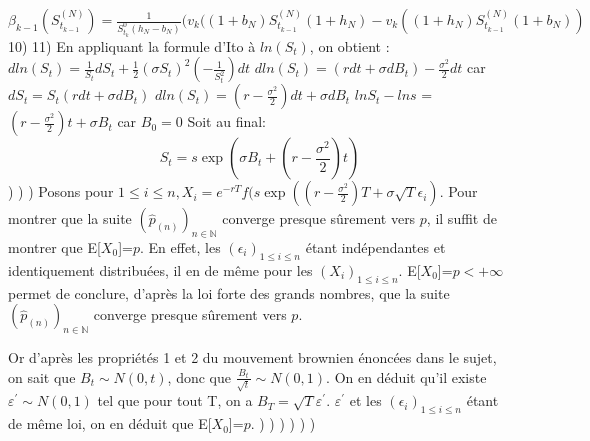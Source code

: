 \documentclass{exam}
\begin{document}
\vspace{0.5cm}
$\beta_{k-1}(S_{t_{k-1}}^{(N)})=\frac{1}{S_{t_k}^0(h_N-b_N)}(v_k((1+b_N)S_{t_{k-1}}^{(N)}(1+h_N)-v_k((1+h_N)S_{t_{k-1}}^{(N)}(1+b_N))$
\newline
\vspace{0.5cm}
10) 
\newline
\vspace{0.5cm}
11) En appliquant la formule d'Ito à $ln (S_t)$, on obtient :
\newline
\espace
$dln(S_t)=\frac{1}{S_t}dS_t + \frac{1}{2}(\sigma S_t)^{2}(-\frac{1}{S_t^{2}})dt$  
\newline
\espace
\Longleftrightarrow \hspace{0.5cm} $dln(S_t)=(r dt + \sigma dB_t)-\frac{\sigma^{2}}{2} dt$ \hspace{0.5cm} car \hspace{0.5cm} $dS_t=S_t(rdt + \sigma dB_t)$
\newline
\espace
\Longleftrightarrow \hspace{0.5cm} $dln(S_t)=(r-\frac{\sigma^2}{2})dt + \sigma dB_t$
\newline
\espace
\Longleftrightarrow \hspace{0.5cm} $lnS_t - lns$ = $(r-\frac{\sigma^2}{2})t + \sigma B_t$ \hspace{0.5cm} car $B_0=0$
\newline
\espace
Soit au final:
\newline
\espace
$$\boxed{S_t=s \exp{(\sigma B_t + (r-\frac{\sigma^2}{2})t)}}$$
\newline
{})
\newline
{})
\newline
{}) Posons pour $1 \leq i \leq n, X_i = e^{-rT}f(s \exp ((r-\frac{\sigma^2}{2})T + \sigma \sqrt{T} \epsilon_i)$. Pour montrer que la suite $(\hat{p}_{(n)})_{n \in \mathbb{N}}$ converge presque sûrement vers $p$, il suffit de montrer que E[$X_0$]=$p$. En effet, les $(\epsilon_i)_{1 \leq i \leq n}$ étant indépendantes et identiquement distribuées, il en de même pour les $(X_i)_{1 \leq i \leq n}$. E[$X_0$]=$p < +\infty$ permet de conclure, d'après la loi forte des grands nombres, que la suite $(\hat{p}_{(n)})_{n \in \mathbb{N}}$ converge presque sûrement vers $p$. 

Or d'après les propriétés 1 et 2 du mouvement brownien énoncées dans le sujet, on sait que $B_t \sim N(0,t)$, donc que $\frac{B_t}{\sqrt{t}} \sim N(0,1)$. On en déduit qu'il existe $\varepsilon^{'} \sim N(0,1)$ tel que pour tout T, on a $B_T = \sqrt{T}\varepsilon^{'}$. $\varepsilon^{'}$ et les $(\epsilon_i)_{1 \leq i \leq n}$ étant de même loi, on en déduit que  E[$X_0$]=$p$.
\newline
{})
\newline
{})
\newline
{})
\newline
{})
\newline
{})
\newline
{})
\end{document}
